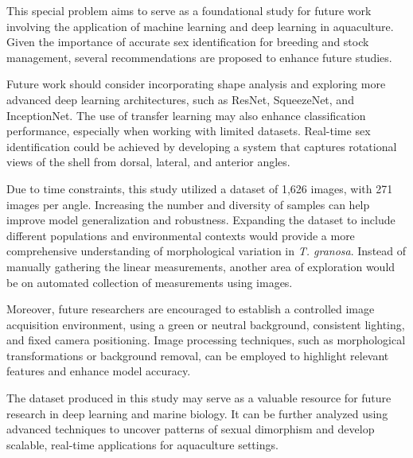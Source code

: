 This special problem aims to serve as a foundational study for future work involving the application of machine learning and deep learning in aquaculture. Given the importance of accurate sex identification for breeding and stock management, several recommendations are proposed to enhance future studies.

Future work should consider incorporating shape analysis and exploring more advanced deep learning architectures, such as ResNet, SqueezeNet, and InceptionNet. The use of transfer learning may also enhance classification performance, especially when working with limited datasets. Real-time sex identification could be achieved by developing a system that captures rotational views of the shell from dorsal, lateral, and anterior angles.

Due to time constraints, this study utilized a dataset of 1,626 images, with 271 images per angle. Increasing the number and diversity of samples can help improve model generalization and robustness. Expanding the dataset to include different populations and environmental contexts would provide a more comprehensive understanding of morphological variation in \textit{T. granosa}. Instead of manually gathering the linear measurements, another area of exploration would be on automated collection of measurements using images.

Moreover, future researchers are encouraged to establish a controlled image acquisition environment, using a green or neutral background, consistent lighting, and fixed camera positioning. Image processing techniques, such as morphological transformations or background removal, can be employed to highlight relevant features and enhance model accuracy.

The dataset produced in this study may serve as a valuable resource for future research in deep learning and marine biology. It can be further analyzed using advanced techniques to uncover patterns of sexual dimorphism and develop scalable, real-time applications for aquaculture settings.